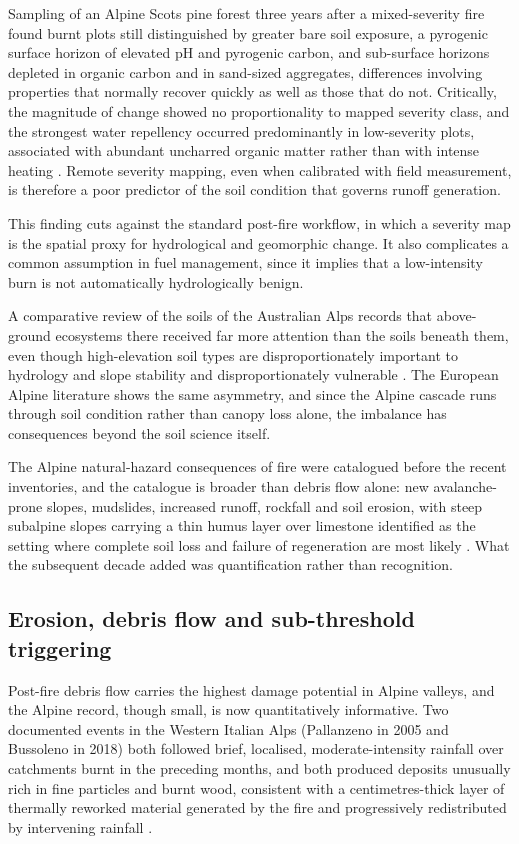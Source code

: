 \documentclass[11pt,a4paper]{article}
\begin{document}
Sampling of an Alpine Scots pine forest three years after a mixed-severity fire found burnt plots still distinguished by greater bare soil exposure, a pyrogenic surface horizon of elevated pH and pyrogenic carbon, and sub-surface horizons depleted in organic carbon and in sand-sized aggregates, differences involving properties that normally recover quickly as well as those that do not. Critically, the magnitude of change showed no proportionality to mapped severity class, and the strongest water repellency occurred predominantly in low-severity plots, associated with abundant uncharred organic matter rather than with intense heating \citep{negri_wildfire_2026}. Remote severity mapping, even when calibrated with field measurement, is therefore a poor predictor of the soil condition that governs runoff generation.

This finding cuts against the standard post-fire workflow, in which a severity map is the spatial proxy for hydrological and geomorphic change. It also complicates a common assumption in fuel management, since it implies that a low-intensity burn is not automatically hydrologically benign.

A comparative review of the soils of the Australian Alps records that above-ground ecosystems there received far more attention than the soils beneath them, even though high-elevation soil types are disproportionately important to hydrology and slope stability and disproportionately vulnerable \citep{wilson_distribution_2022}. The European Alpine literature shows the same asymmetry, and since the Alpine cascade runs through soil condition rather than canopy loss alone, the imbalance has consequences beyond the soil science itself.

The Alpine natural-hazard consequences of fire were catalogued before the recent inventories, and the catalogue is broader than debris flow alone: new avalanche-prone slopes, mudslides, increased runoff, rockfall and soil erosion, with steep subalpine slopes carrying a thin humus layer over limestone identified as the setting where complete soil loss and failure of regeneration are most likely \citep{muller_forest_2020}. What the subsequent decade added was quantification rather than recognition.

\subsection{Erosion, debris flow and sub-threshold triggering}

Post-fire debris flow carries the highest damage potential in Alpine valleys, and the Alpine record, though small, is now quantitatively informative. Two documented events in the Western Italian Alps (Pallanzeno in 2005 and Bussoleno in 2018) both followed brief, localised, moderate-intensity rainfall over catchments burnt in the preceding months, and both produced deposits unusually rich in fine particles and burnt wood, consistent with a centimetres-thick layer of thermally reworked material generated by the fire and progressively redistributed by intervening rainfall \citep{tiranti_wildfires_2021}.
\end{document}

